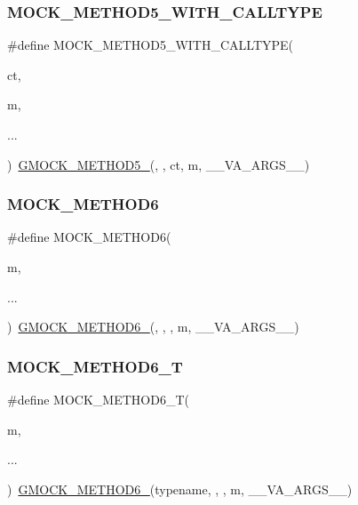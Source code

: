 \subsubsection{\texorpdfstring{MOCK\_METHOD5\_WITH\_CALLTYPE}{MOCK\_METHOD5\_WITH\_CALLTYPE}}
{\footnotesize\ttfamily \#define M\+O\+C\+K\+\_\+\+M\+E\+T\+H\+O\+D5\+\_\+\+W\+I\+T\+H\+\_\+\+C\+A\+L\+L\+T\+Y\+PE(\begin{DoxyParamCaption}\item[{}]{ct,  }\item[{}]{m,  }\item[{}]{... }\end{DoxyParamCaption})~\mbox{\hyperlink{gmock-generated-function-mockers_8h_a9e3ecd392499ab19a4a6d3adcabf56f6}{G\+M\+O\+C\+K\+\_\+\+M\+E\+T\+H\+O\+D5\+\_\+}}(, , ct, m, \+\_\+\+\_\+\+V\+A\+\_\+\+A\+R\+G\+S\+\_\+\+\_\+)}

\mbox{\label{gmock-generated-function-mockers_8h_add8f8f786444c2c85ac67f550dbde5a6}} 
\subsubsection{\texorpdfstring{MOCK\_METHOD6}{MOCK\_METHOD6}}
{\footnotesize\ttfamily \#define M\+O\+C\+K\+\_\+\+M\+E\+T\+H\+O\+D6(\begin{DoxyParamCaption}\item[{}]{m,  }\item[{}]{... }\end{DoxyParamCaption})~\mbox{\hyperlink{gmock-generated-function-mockers_8h_ad0ca7f6973a076d0af4c953f8ed91842}{G\+M\+O\+C\+K\+\_\+\+M\+E\+T\+H\+O\+D6\+\_\+}}(, , , m, \+\_\+\+\_\+\+V\+A\+\_\+\+A\+R\+G\+S\+\_\+\+\_\+)}

\mbox{\label{gmock-generated-function-mockers_8h_a0d16357a0043d36b167a1c42ef33f672}} 
\subsubsection{\texorpdfstring{MOCK\_METHOD6\_T}{MOCK\_METHOD6\_T}}
{\footnotesize\ttfamily \#define M\+O\+C\+K\+\_\+\+M\+E\+T\+H\+O\+D6\+\_\+T(\begin{DoxyParamCaption}\item[{}]{m,  }\item[{}]{... }\end{DoxyParamCaption})~\mbox{\hyperlink{gmock-generated-function-mockers_8h_ad0ca7f6973a076d0af4c953f8ed91842}{G\+M\+O\+C\+K\+\_\+\+M\+E\+T\+H\+O\+D6\+\_\+}}(typename, , , m, \+\_\+\+\_\+\+V\+A\+\_\+\+A\+R\+G\+S\+\_\+\+\_\+)}

